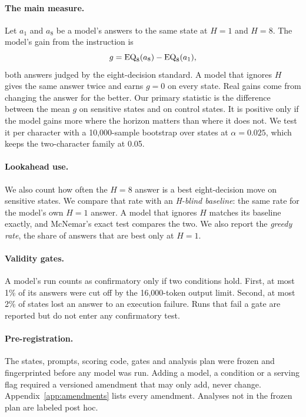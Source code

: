 \paragraph{The main measure.} Let $a_1$ and $a_8$ be a model's answers to the same state at $H{=}1$ and $H{=}8$. The model's gain from the instruction is
\[
g = \mathrm{EQ}_{8}(a_8) - \mathrm{EQ}_{8}(a_1),
\]
both answers judged by the eight-decision standard. A model that ignores $H$ gives the same answer twice and earns $g{=}0$ on every state. Real gains come from changing the answer for the better. Our primary statistic is the difference between the mean $g$ on sensitive states and on control states. It is positive only if the model gains more where the horizon matters than where it does not. We test it per character with a 10,000-sample bootstrap over states at $\alpha = 0.025$, which keeps the two-character family at 0.05.

\paragraph{Lookahead use.} We also count how often the $H{=}8$ answer is a best eight-decision move on sensitive states. We compare that rate with an \emph{H-blind baseline}: the same rate for the model's own $H{=}1$ answer. A model that ignores $H$ matches its baseline exactly, and McNemar's exact test \citep{mcnemar1947} compares the two. We also report the \emph{greedy rate}, the share of answers that are best only at $H{=}1$.

\paragraph{Validity gates.} A model's run counts as confirmatory only if two conditions hold. First, at most 1\% of its answers were cut off by the 16,000-token output limit. Second, at most 2\% of states lost an answer to an execution failure. Runs that fail a gate are reported but do not enter any confirmatory test.

\paragraph{Pre-registration.} The states, prompts, scoring code, gates and analysis plan were frozen and fingerprinted before any model was run. Adding a model, a condition or a serving flag required a versioned amendment that may only add, never change. Appendix~\ref{app:amendments} lists every amendment. Analyses not in the frozen plan are labeled post hoc.

